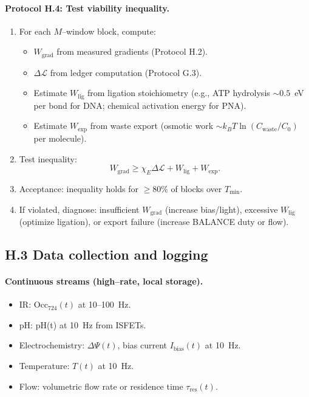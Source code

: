 \documentclass[11pt]{article}
\begin{document}
\paragraph{Protocol H.4: Test viability inequality.}
\begin{enumerate}
\item For each $M$–window block, compute:
\begin{itemize}
\item $W_{\mathrm{grad}}$ from measured gradients (Protocol H.2).
\item $\Delta\mathcal{L}$ from ledger computation (Protocol G.3).
\item Estimate $W_{\mathrm{lig}}$ from ligation stoichiometry (e.g., ATP hydrolysis $\sim 0.5$~eV per bond for DNA; chemical activation energy for PNA).
\item Estimate $W_{\mathrm{exp}}$ from waste export (osmotic work $\sim k_BT\ln(C_{\mathrm{waste}}/C_0)$ per molecule).
\end{itemize}
\item Test inequality:
\[
W_{\mathrm{grad}}\ge \chi_E\Delta\mathcal{L}+W_{\mathrm{lig}}+W_{\mathrm{exp}}.
\]
\item Acceptance: inequality holds for $\ge 80\%$ of blocks over $T_{\min}$.
\item If violated, diagnose: insufficient $W_{\mathrm{grad}}$ (increase bias/light), excessive $W_{\mathrm{lig}}$ (optimize ligation), or export failure (increase \textsf{BALANCE} duty or flow).
\end{enumerate}

\subsection*{H.3 Data collection and logging}

\paragraph{Continuous streams (high–rate, local storage).}
\begin{itemize}
\item IR: $\mathrm{Occ}_{724}(t)$ at 10–100~Hz.
\item pH: pH(t) at 10~Hz from ISFETs.
\item Electrochemistry: $\Delta\Psi(t)$, bias current $I_{\mathrm{bias}}(t)$ at 10~Hz.
\item Temperature: $T(t)$ at 10~Hz.
\item Flow: volumetric flow rate or residence time $\tau_{\mathrm{res}}(t)$.
\end{itemize}
\end{document}
